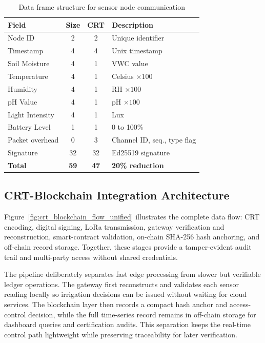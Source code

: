 \documentclass[pdflatex,sn-mathphys-num]{sn-jnl}
\theoremstyle{thmstyleone}
\theoremstyle{thmstyletwo}
\theoremstyle{thmstylethree}
\begin{document}
\begin{table}[htbp]
\centering
\caption{Data frame structure for sensor node communication}
\label{tab:data-frame}
\begin{tabular}{p{2.2cm} c c p{4.5cm}}
\toprule
\textbf{Field} & \textbf{Size} & \textbf{CRT} & \textbf{Description} \\
\midrule
Node ID        & 2  & 2  & Unique identifier \\
Timestamp      & 4  & 4  & Unix timestamp \\
Soil Moisture  & 4  & 1  & VWC value \\
Temperature    & 4  & 1  & Celsius $\times 100$ \\
Humidity       & 4  & 1  & RH $\times 100$ \\
pH Value       & 4  & 1  & pH $\times 100$ \\
Light Intensity& 4  & 1  & Lux \\
Battery Level  & 1  & 1  & 0 to 100\% \\
Packet overhead& 0  & 3  & Channel ID, seq., type flag \\
Signature      & 32 & 32 & Ed25519 signature \\
\midrule
\textbf{Total} & \textbf{59} & \textbf{47} & \textbf{20\% reduction} \\
\bottomrule
\end{tabular}
\end{table}

\subsection{CRT-Blockchain Integration Architecture}
\label{subsec:crt_blockchain_integration}

Figure~\ref{fig:crt_blockchain_flow_unified} illustrates the complete data flow: CRT encoding, digital signing, LoRa transmission, gateway verification and reconstruction, smart-contract validation, on-chain SHA-256 hash anchoring, and off-chain record storage. Together, these stages provide a tamper-evident audit trail and multi-party access without shared credentials.

The pipeline deliberately separates fast edge processing from slower but verifiable ledger operations. The gateway first reconstructs and validates each sensor reading locally so irrigation decisions can be issued without waiting for cloud services. The blockchain layer then records a compact hash anchor and access-control decision, while the full time-series record remains in off-chain storage for dashboard queries and certification audits. This separation keeps the real-time control path lightweight while preserving traceability for later verification.
\end{document}
